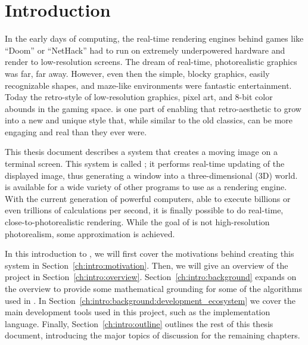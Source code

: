 %
%

\chapter{Introduction}
\label{ch:intro}

In the early days of computing, the real-time rendering engines behind games like ``Doom'' or ``NetHack'' had to run on extremely underpowered hardware and render to low-resolution screens.
The dream of real-time, photorealistic graphics was far, far away.
However, even then the simple, blocky graphics, easily recognizable shapes, and maze-like environments were fantastic entertainment.
Today the retro-style of low-resolution graphics, pixel art, and 8-bit color abounds in the gaming space.
\name{} is one part of enabling that retro-aesthetic to grow into a new and unique style that, while similar to the old classics, can be more engaging and real than they ever were.

This thesis document describes a system that creates a moving image on a terminal screen.
This system is called \name{}; it performs real-time updating of the displayed image, thus generating a window into a three-dimensional (3D) world.
\name{} is available for a wide variety of other programs to use as a rendering engine.
With the current generation of powerful computers, able to execute billions or even trillions of calculations per second, it is finally possible to do real-time, close-to-photorealistic rendering.
While the goal of \name{} is not high-resolution photorealism, some approximation is achieved.

In this introduction to \name{}, we will first cover the motivations behind creating this system in Section~\ref{ch:intro:motivation}.
Then, we will give an overview of the project in Section~\ref{ch:intro:overview}.
Section~\ref{ch:intro:background} expands on the overview to provide some mathematical grounding for some of the algorithms used in \name{}.
In Section~\ref{ch:intro:background:development_ecosystem} we cover the main development tools used in this project, such as the implementation language.
Finally, Section~\ref{ch:intro:outline} outlines the rest of this thesis document, introducing the major topics of discussion for the remaining chapters.

